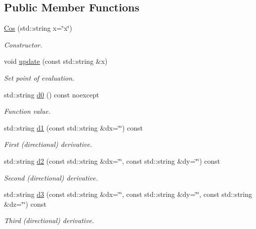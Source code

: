 \subsection*{Public Member Functions}
\begin{DoxyCompactItemize}
\item 
\hyperlink{structFunG_1_1stringify_1_1Cos_a9069519fc6a176ae47f9b70a29da2e44}{Cos} (std\-::string x=\char`\"{}x\char`\"{})
\begin{DoxyCompactList}\small\item\em Constructor. \end{DoxyCompactList}\item 
void \hyperlink{structFunG_1_1stringify_1_1Cos_a3f0de2f0759f6b680eca1a844d0c4dde}{update} (const std\-::string \&x)
\begin{DoxyCompactList}\small\item\em Set point of evaluation. \end{DoxyCompactList}\item 
std\-::string \hyperlink{structFunG_1_1stringify_1_1Cos_aba8c4e517e67faca4b20814a5765070a}{d0} () const noexcept
\begin{DoxyCompactList}\small\item\em Function value. \end{DoxyCompactList}\item 
std\-::string \hyperlink{structFunG_1_1stringify_1_1Cos_a0529aa1639af25cd28cd2e2e0b671466}{d1} (const std\-::string \&dx=\char`\"{}\char`\"{}) const 
\begin{DoxyCompactList}\small\item\em First (directional) derivative. \end{DoxyCompactList}\item 
std\-::string \hyperlink{structFunG_1_1stringify_1_1Cos_a771b19e97e2fc910b24fbcc0f806bdd3}{d2} (const std\-::string \&dx=\char`\"{}\char`\"{}, const std\-::string \&dy=\char`\"{}\char`\"{}) const 
\begin{DoxyCompactList}\small\item\em Second (directional) derivative. \end{DoxyCompactList}\item 
std\-::string \hyperlink{structFunG_1_1stringify_1_1Cos_ad6f265f296b7cf2da1f5a9ecfc98598e}{d3} (const std\-::string \&dx=\char`\"{}\char`\"{}, const std\-::string \&dy=\char`\"{}\char`\"{}, const std\-::string \&dz=\char`\"{}\char`\"{}) const 
\begin{DoxyCompactList}\small\item\em Third (directional) derivative. \end{DoxyCompactList}\end{DoxyCompactItemize}


